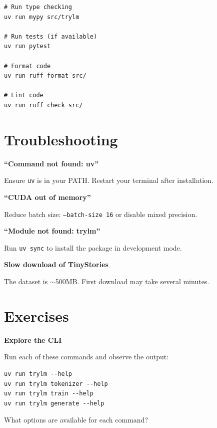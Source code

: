 \begin{lstlisting}[style=shell]
# Run type checking
uv run mypy src/trylm

# Run tests (if available)
uv run pytest

# Format code
uv run ruff format src/

# Lint code
uv run ruff check src/
\end{lstlisting}

\section{Troubleshooting}

\begin{pitfall}[title=Common Issues]
\textbf{``Command not found: uv''}

Ensure \texttt{uv} is in your PATH. Restart your terminal after installation.

\textbf{``CUDA out of memory''}

Reduce batch size: \texttt{--batch-size 16} or disable mixed precision.

\textbf{``Module not found: trylm''}

Run \texttt{uv sync} to install the package in development mode.

\textbf{Slow download of TinyStories}

The dataset is $\sim$500MB. First download may take several minutes.
\end{pitfall}

\section{Exercises}

\begin{exercise}
\textbf{Explore the CLI}

Run each of these commands and observe the output:
\begin{lstlisting}[style=shell, numbers=none]
uv run trylm --help
uv run trylm tokenizer --help
uv run trylm train --help
uv run trylm generate --help
\end{lstlisting}
What options are available for each command?
\end{exercise}

